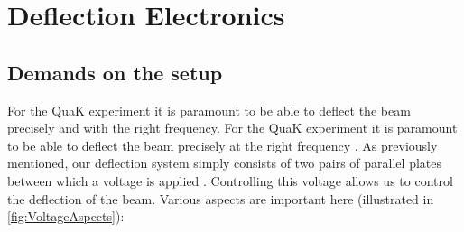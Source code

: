 
\chapter{Deflection Electronics}

\section{Demands on the setup}
For the QuaK experiment it is paramount to be able to deflect the beam precisely and with the right frequency. 
For the QuaK experiment it is paramount to be able to deflect the beam  precisely at the right frequency . 
As previously mentioned, our deflection system simply consists of two pairs of parallel plates between which a voltage is applied . Controlling this voltage allows us to control the deflection of the beam. Various aspects are important here (illustrated in \cref{fig:VoltageAspects}):

